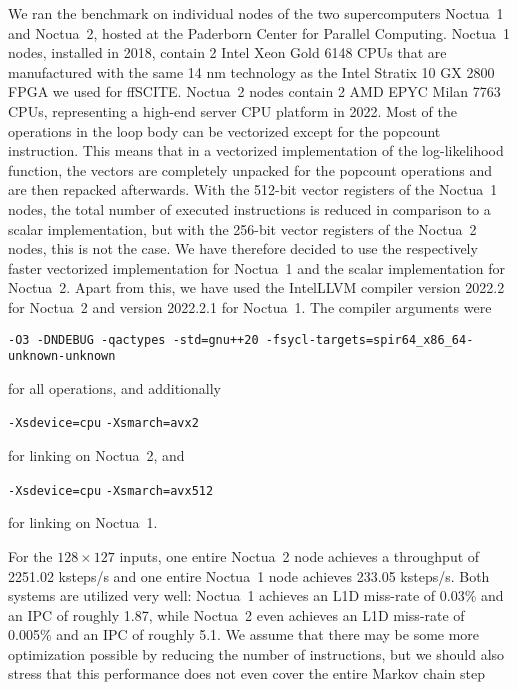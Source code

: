 We ran the benchmark on individual nodes of the two supercomputers Noctua~1 and Noctua~2, hosted at the Paderborn Center for Parallel Computing.
Noctua~1 nodes, installed in 2018, contain 2 Intel Xeon Gold 6148 CPUs that are manufactured with the same 14 nm technology as the Intel Stratix 10 GX 2800 \ac{FPGA} we used for \ac{ffSCITE}. 
Noctua~2 nodes contain 2 AMD EPYC Milan 7763 CPUs, representing a high-end server CPU platform in 2022.
Most of the operations in the loop body can be vectorized except for the popcount instruction. This means that in a vectorized implementation of the log-likelihood function, the vectors are completely unpacked for the popcount operations and are then repacked afterwards. With the 512-bit vector registers of the Noctua~1 nodes, the total number of executed instructions is reduced in comparison to a scalar implementation, but with the 256-bit vector registers of the Noctua~2 nodes, this is not the case. We have therefore decided to use the respectively faster vectorized implementation for Noctua~1 and the scalar implementation for Noctua~2. Apart from this, we have used the IntelLLVM compiler version 2022.2 for Noctua~2 and version 2022.2.1 for Noctua~1. The compiler arguments were
\begin{center}
    \texttt{-O3 -DNDEBUG -qactypes -std=gnu++20 -fsycl-targets=spir64\_x86\_64-unknown-unknown}
\end{center}
for all operations, and additionally
\begin{center}
    \texttt{-Xsdevice=\allowbreak cpu} \texttt{-Xsmarch=\allowbreak avx2}
\end{center}
for linking on Noctua~2, and 
\begin{center}
    \texttt{-Xsdevice=\allowbreak cpu} \texttt{-Xsmarch=\allowbreak avx512}
\end{center}
for linking on Noctua~1.

For the $128 \times 127$ inputs, one entire Noctua~2 node achieves a throughput of 2251.02 ksteps/s and one entire Noctua~1 node achieves 233.05 ksteps/s. Both systems are utilized very well: Noctua~1 achieves an L1D miss-rate of 0.03\% and an IPC of roughly 1.87, while Noctua~2 even achieves an L1D miss-rate of 0.005\% and an IPC of roughly 5.1. We assume that there may be some more optimization possible by reducing the number of instructions, but we should also stress that this performance does not even cover the entire Markov chain step %


